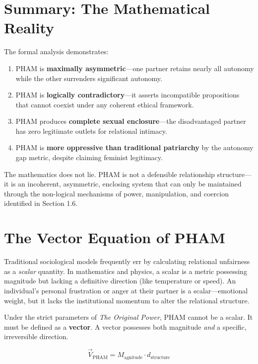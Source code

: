 \documentclass[12pt,openany]{book}
\numberwithin{equation}{chapter}
\begin{document}
\section{Summary: The Mathematical Reality}

The formal analysis demonstrates:

\begin{enumerate}
    \item PHAM is \textbf{maximally asymmetric}---one partner retains nearly all autonomy while the other surrenders significant autonomy.
    
    \item PHAM is \textbf{logically contradictory}---it asserts incompatible propositions that cannot coexist under any coherent ethical framework.
    
    \item PHAM produces \textbf{complete sexual enclosure}---the disadvantaged partner has zero legitimate outlets for relational intimacy.
    
    \item PHAM is \textbf{more oppressive than traditional patriarchy} by the autonomy gap metric, despite claiming feminist legitimacy.
\end{enumerate}

The mathematics does not lie. PHAM is not a defensible relationship structure---it is an incoherent, asymmetric, enclosing system that can only be maintained through the non-logical mechanisms of power, manipulation, and coercion identified in Section 1.6.

\section{The Vector Equation of PHAM}

Traditional sociological models frequently err by calculating relational unfairness as a \textit{scalar} quantity. In mathematics and physics, a scalar is a metric possessing magnitude but lacking a definitive direction (like temperature or speed). An individual's personal frustration or anger at their partner is a scalar---emotional weight, but it lacks the institutional momentum to alter the relational structure.

Under the strict parameters of \textit{The Original Power}, PHAM cannot be a scalar. It must be defined as a \textbf{vector}. A vector possesses both magnitude \textit{and} a specific, irreversible direction.

\begin{equation}\label{eq:pham-vector}
\vec{V}_{\text{PHAM}} = M_{\text{agnitude}} \cdot \hat{d}_{\text{structure}}
\end{equation}
\end{document}

